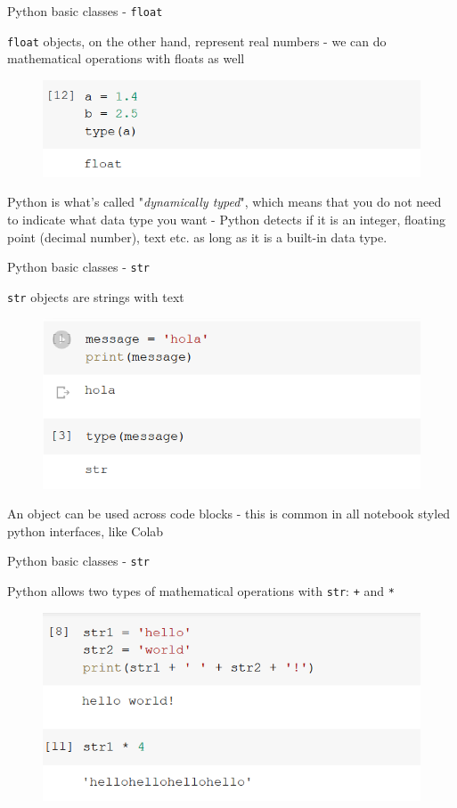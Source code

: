 \documentclass[aspectratio=169]{beamer}
\begin{document}
\begin{frame}{Python basic classes - \texttt{float}}

	\texttt{float} objects, on the other hand, represent real numbers 
	- we can do mathematical operations with floats as well

	\begin{figure}
		\centering
		\includegraphics[width=0.6\linewidth]{img/type_float.png}
	\end{figure}

	Python is what's called "\textit{dynamically typed}", 
	which means that you do not need to indicate what data type you want 
	- Python detects if it is an integer, floating point (decimal number), 
	text etc. as long as it is a built-in data type.

\end{frame}

\begin{frame}{Python basic classes - \texttt{str}}

	\texttt{str} objects are strings with text

	\begin{figure}
		\centering
		\includegraphics[width=0.6\linewidth]{img/string_type.png}
	\end{figure}

	An object can be used across code blocks 
	- this is common in all notebook styled python interfaces, like Colab

\end{frame}

\begin{frame}{Python basic classes - \texttt{str}}

	Python allows two types of mathematical operations with \texttt{str}: \texttt{+} and \texttt{*}

	\begin{figure}
		\centering
		\includegraphics[width=0.6\linewidth]{img/string_operations.png}
	\end{figure}

\end{frame}
\end{document}
